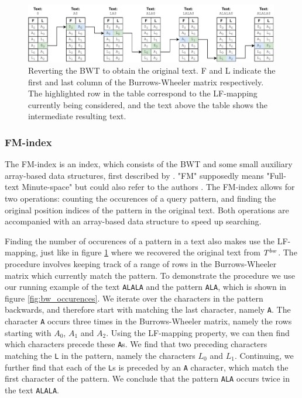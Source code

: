\begin{figure}[ht]
\centering
\includegraphics[width=0.99\textwidth]{figures/bwt_reverse.pdf}
\caption{Reverting the BWT to obtain the original text. F and L indicate the first and last column of the Burrows-Wheeler matrix respectively. The highlighted row in the table correspond to the LF-mapping currently being considered, and the text above the table shows the intermediate resulting text.}
\label{fig:bwt_reverse}
\end{figure}

\subsubsection{FM-index} \label{section:background_fmindex}

The FM-index is an index, which consists of the BWT and some small auxiliary array-based data structures, first described by \citeauthor{ferragina_opportunistic_2000} \cite{ferragina_opportunistic_2000}.
"FM" supposedly means "Full-text Minute-space" but could also refer to the authors \cite{langmead_introduction_nodate}.
The FM-index allows for two operations: counting the occurences of a query pattern, and finding the original position indices of the pattern in the original text.
Both operations are accompanied with an array-based data structure to speed up searching.

Finding the number of occurences of a pattern in a text also makes use the LF-mapping, just like in figure \ref{fig:bwt_reverse} where we recovered the original text from $T^{bw}$.
The procedure involves keeping track of a range of rows in the Burrows-Wheeler matrix which currently match the pattern.
To demonstrate the procedure we use our running example of the text \texttt{ALALA} and the pattern \texttt{ALA}, which is shown in figure \ref{fig:bw_occurences}.
We iterate over the characters in the pattern backwards, and therefore start with matching the last character, namely \texttt{A}.
The character \texttt{A} occurs three times in the Burrows-Wheeler matrix, namely the rows starting with $A_0$, $A_1$ and $A_2$.
Using the LF-mapping property, we can then find which characters precede these \texttt{A}s.
We find that two preceding characters matching the \texttt{L} in the pattern, namely the characters $L_0$ and $L_1$.
Continuing, we further find that each of the \texttt{L}s is preceded by an \texttt{A} character, which match the first character of the pattern.
We conclude that the pattern \texttt{ALA} occurs twice in the text \texttt{ALALA}.

